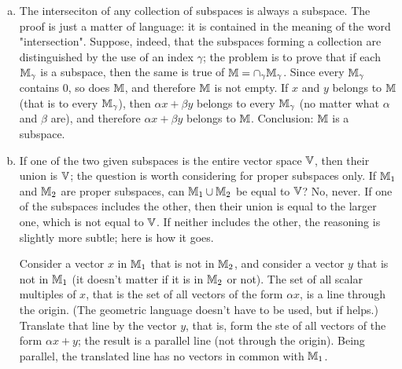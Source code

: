 \begin{enumerate}[(a)]
    \item The interseciton of any collection of subspaces is always a subspace. The proof is just a matter of language: it is contained in the meaning of the word "intersection". Suppose, indeed, that the subspaces forming a collection are distinguished by the use of an index $\gamma$; the problem is to prove that if each $\mathbb{M}_\gamma$ is a subspace, then the same is true of $\mathbb{M} = \cap_\gamma \mathbb{M}_\gamma$. Since every $\mathbb{M}_\gamma$ contains 0, so does $\mathbb{M}$, and therefore $\mathbb{M}$ is not empty. If $x$ and $y$ belongs to $\mathbb{M}$ (that is to every $\mathbb{M}_\gamma$), then $\alpha x + \beta y$ belongs to every $\mathbb{M}_\gamma$ (no matter what $\alpha$ and $\beta$ are), and therefore $\alpha x + \beta y$ belongs to $\mathbb{M}$. Conclusion: $\mathbb{M}$ is a subspace.
    \item If one of the two given subspaces is the entire vector space $\mathbb{V}$, then their union is $\mathbb{V}$; the question is worth considering for proper subspaces only. If $\mathbb{M}_1$ and $\mathbb{M}_2$ are proper subspaces, can $\mathbb{M}_1 \cup \mathbb{M}_2$ be equal to $\mathbb{V}$? No, never. If one of the subspaces includes the other, then their union is equal to the larger one, which is not equal to $\mathbb{V}$. If neither includes the other, the reasoning is slightly more subtle; here is how it goes.

          Consider a vector $x$ in $\mathbb{M}_1$ that is not in $\mathbb{M}_2$, and consider a vector $y$ that is not in $\mathbb{M}_1$ (it doesn't matter if it is in $\mathbb{M}_2$ or not). The set of all scalar multiples of $x$, that is the set of all vectors of the form $\alpha x$, is a line through the origin. (The geometric language doesn't have to be used, but if helps.) Translate that line by the vector $y$, that is, form the ste of all vectors of the form $\alpha x + y$; the result is a parallel line (not through the origin). Being parallel, the translated line has no vectors in common with $\mathbb{M}_1$.
\end{enumerate}